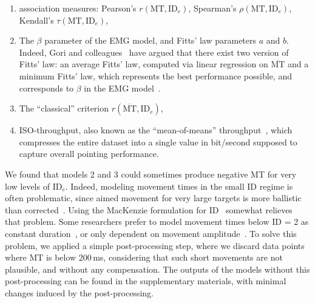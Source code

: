 \documentclass[acmlarge, manuscript,review]{acmart}
\newcommand{\mmt}{\ensuremath{\overline{\mt}}\xspace}
\newcommand{\mt}{\ensuremath{{\text{MT}}}\xspace}
\newcommand{\ide}{\ensuremath{{\text{ID}_e}}\xspace}
\begin{document}
\begin{enumerate}
  \item association measures: Pearson's $r(\mt, \ide)$, Spearman's $\rho(\mt, \ide)$, Kendall's $\tau(\mt, \ide)$,
  \item The $\beta$ parameter of the EMG model, and Fitts' law parameters $a$ and $b$. Indeed, Gori and colleagues~\cite{gori2017,gori2018tochi} have argued that there exist two version of Fitts' law: an average Fitts' law, computed via linear regression on \mmt and a minimum Fitts' law, which represents the best performance possible, and corresponds to $\beta$ in the EMG model~\cite{gori2019}.
  \item The ``classical'' criterion $r(\overline{\mt}, \ide)$,
  \item ISO-throughput, also known as the ``mean-of-means'' throughput~\cite{soukoreff2004}, which compresses the entire dataset into a single value in bit/second supposed to capture overall pointing performance.
\end{enumerate}

We found that models 2 and 3 could sometimes produce negative MT for very low levels of \ide. Indeed, modeling movement times in the small ID regime is often problematic, since aimed movement for very large targets is more ballistic than corrected~\cite{elliott2017,gori2020}. Using the MacKenzie formulation for ID~\cite{gori2018chi} somewhat relieves that problem. Some researchers prefer to model movement times below ID = 2 as constant duration~\cite{crossman1957}, or only dependent on movement amplitude~\cite{gan1988}.
To solve this problem, we applied a simple post-processing step, where we  discard data points where MT is below 200\,ms, considering that such short movements are not plausible, and without any compensation. The outputs of the models without this post-processing can be found in the supplementary materials, with minimal changes induced by the post-processing.
\end{document}
